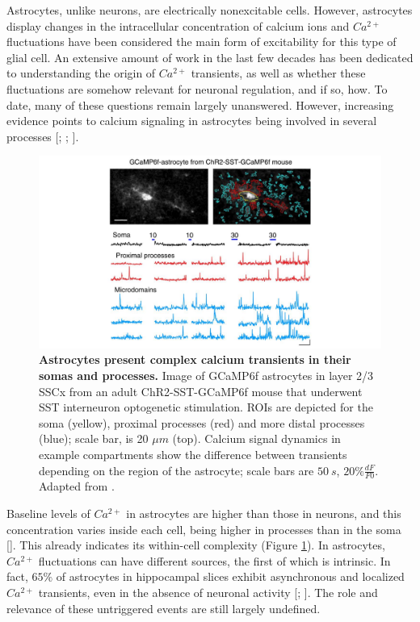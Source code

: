 Astrocytes, unlike neurons, are electrically nonexcitable cells.
However, astrocytes display changes in the intracellular concentration of calcium ions and $Ca^{2+}$ fluctuations have been considered the main form of excitability for this type of glial cell.
An extensive amount of work in the last few decades has been dedicated to understanding the origin of $Ca^{2+}$ transients, as well as whether these fluctuations are somehow relevant for neuronal regulation, and if so, how.
To date, many of these questions remain largely unanswered. 
However, increasing evidence points to calcium signaling in astrocytes being involved in several processes [\cite{araque2014gliotransmitters}; \cite{volterra2014astrocyte}; \cite{khakh2019emerging}]. 
\begin{figure}[h]
    \centering
    \includegraphics[trim={200 0 200 0},clip,width=\textwidth]{Figures/Chapter1/intro_fig_astro_calcium.pdf}
    \caption[Astrocytes present complex calcium transients in their somas and processes.]{\textbf{Astrocytes present complex calcium transients in their somas and processes.} 
    Image of GCaMP6f astrocytes in layer 2/3 SSCx from an adult ChR2-SST-GCaMP6f mouse that underwent SST interneuron optogenetic stimulation. 
    ROIs are depicted for the soma (yellow), proximal processes (red) and more distal processes (blue); scale bar, is 20 $\mu m$ (top). 
    Calcium signal dynamics in example compartments show the difference between transients depending on the region of the astrocyte; scale bars are $50\ s$, $20\% \frac{dF}{F0}$. Adapted from \cite{mariotti2018}.}
    \label{fig:chap1:astro_calcium}
\end{figure}

Baseline levels of $Ca^{2+}$ in astrocytes are higher than those in neurons, and this concentration varies inside each cell, being higher in processes than in the soma [\cite{zheng2015}].
This already indicates its within-cell complexity (Figure \ref{fig:chap1:astro_calcium}). 
In astrocytes, $Ca^{2+}$ fluctuations can have different sources, the first of which is intrinsic. 
In fact, $65\%$ of astrocytes in hippocampal slices exhibit asynchronous and localized $Ca^{2+}$ transients, even in the absence of neuronal activity [\cite{nett2002}; \cite{hirase2004}].
The role and relevance of these untriggered events are still largely undefined. 

